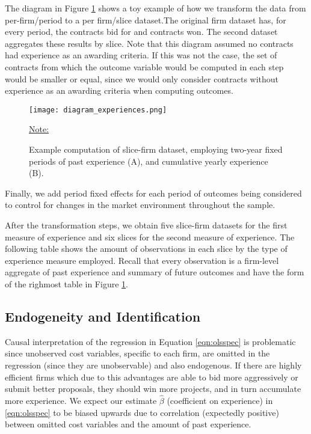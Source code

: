 The diagram in Figure \ref{fig:diagram_experience} shows a toy example of how we transform the data from per-firm/period to a per firm/slice dataset.The original firm dataset has, for every period, the contracts bid for and contracts won. The second dataset aggregates these results by slice. Note that this diagram assumed no contracts had experience as an awarding criteria. If this was not the case, the set of contracts from which the outcome variable would be computed in each step would be smaller or equal, since we would only consider contracts without experience as an awarding criteria when computing outcomes.

\begin{figure}
  \texttt{[image: diagram\_experiences.png]}
  \caption{Example computation of slice-firm dataset, employing two-year fixed periods of past experience (A), and cumulative yearly experience (B).}
  \label{fig:diagram_experience}
  \vskip 0.5mm
  { \footnotesize \underline{Note:} }
\end{figure}

Finally, we add period fixed effects for each period of outcomes being considered to control for changes in the market environment throughout the sample.


After the transformation steps, we obtain five slice-firm datasets for the first measure of experience and six slices for the second measure of experience. The following table shows the amount of observations in each slice by the type of experience measure employed. Recall that every observation is a firm-level aggregate of past experience and summary of future outcomes and have the form of the righmost table in Figure \ref{fig:diagram_experience}.




\subsection{Endogeneity and Identification}
Causal interpretation of the regression in Equation \ref{eqn:olsspec} is problematic since unobserved cost variables, specific to each firm, are omitted in the regression (since they are unobservable) and also endogenous. If there are highly efficient firms which due to this advantages are able to bid more aggressively or submit better proposals, they should win more projects, and in turn accumulate more experience. We expect our estimate $\hat{\beta}$ (coefficient on experience) in \ref{eqn:olsspec} to be biased upwards due to correlation (expectedly positive) between omitted cost variables and the amount of past experience.

